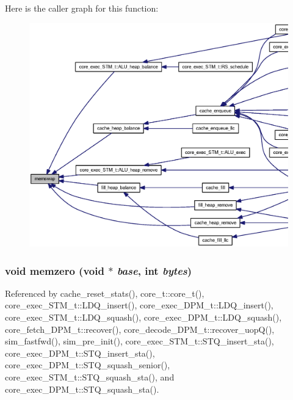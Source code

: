 Here is the caller graph for this function:\nopagebreak
\begin{figure}[H]
\begin{center}
\leavevmode
\includegraphics[width=420pt]{misc_8h_e3e882464975b6a22883e91c787d8478_icgraph}
\end{center}
\end{figure}
\subsubsection[{memzero}]{\setlength{\rightskip}{0pt plus 5cm}void memzero (void $\ast$ {\em base}, \/  int {\em bytes})}\label{misc_8h_c0247ae9677929c0d7a34cd197d3e57e}




Referenced by cache\_\-reset\_\-stats(), core\_\-t::core\_\-t(), core\_\-exec\_\-STM\_\-t::LDQ\_\-insert(), core\_\-exec\_\-DPM\_\-t::LDQ\_\-insert(), core\_\-exec\_\-STM\_\-t::LDQ\_\-squash(), core\_\-exec\_\-DPM\_\-t::LDQ\_\-squash(), core\_\-fetch\_\-DPM\_\-t::recover(), core\_\-decode\_\-DPM\_\-t::recover\_\-uopQ(), sim\_\-fastfwd(), sim\_\-pre\_\-init(), core\_\-exec\_\-STM\_\-t::STQ\_\-insert\_\-sta(), core\_\-exec\_\-DPM\_\-t::STQ\_\-insert\_\-sta(), core\_\-exec\_\-DPM\_\-t::STQ\_\-squash\_\-senior(), core\_\-exec\_\-STM\_\-t::STQ\_\-squash\_\-sta(), and core\_\-exec\_\-DPM\_\-t::STQ\_\-squash\_\-sta().

